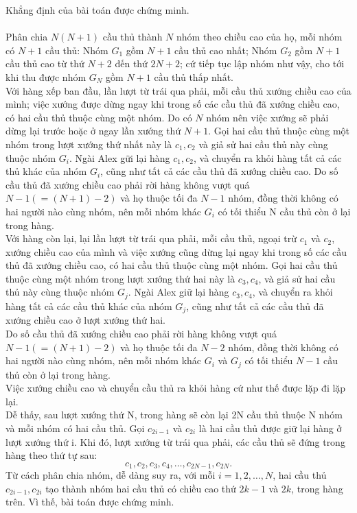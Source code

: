 \begin{bt}
{		Khẳng định của bài toán được chứng minh.\\
		\\ 
		Phân chia $N(N+1)$ cầu thủ thành $N$ nhóm theo chiều cao của họ, mỗi nhóm có $N+1$ cầu thủ: Nhóm $G_1$ gồm $N+1$ cầu thủ cao nhất; Nhóm $G_2$ gồm $N+1$ cầu thủ cao từ thứ $N+2$ đến thứ $2N+2$; cứ tiếp tục lập nhóm như vậy, cho tới khi thu được nhóm $G_N$ gồm $N+1$ cầu thủ thấp nhất.\\
		Với hàng xếp ban đầu, lần lượt từ trái qua phải, mỗi cầu thủ xướng chiều cao của mình; việc xướng được dừng ngay khi trong số các cầu thủ đã xướng chiều cao, có hai cầu thủ thuộc cùng một nhóm. Do có $N$ nhóm nên việc xướng sẽ phải dừng lại trước hoặc ở ngay lần xướng thứ $N+1$. Gọi hai cầu thủ thuộc cùng một nhóm trong lượt xướng thứ nhất này là $c_1,c_2$ và giả sử hai cầu thủ này cùng thuộc nhóm $G_i$. Ngài Alex gữi lại hàng $c_1, c_2$, và chuyển ra khỏi hàng tất cả các thủ khác của nhóm $G_i$, cũng như tất cả các cầu thủ đã xướng chiều cao. Do số cầu thủ đã xướng chiều cao phải rời hàng không vượt quá $N-1(=(N+1)-2)$ và họ thuộc tối đa $N-1$ nhóm, đồng thời không có hai người nào cùng nhóm, nên mỗi nhóm khác $G_i$ có tối thiểu N cầu thủ còn ở lại trong hàng.\\
		Với hàng còn lại, lại lần lượt từ trái qua phải, mỗi cầu thủ, ngoại trừ $c_1$ và $c_2$, xướng chiều cao của mình và việc xướng cũng dừng lại ngay khi trong số các cầu thủ đã xướng chiều cao, có hai cầu thủ thuộc cùng một nhóm. Gọi hai cầu thủ thuộc cùng một nhóm trong lượt xướng thứ hai này là $c_3, c_4$, và giả sử hai cầu thủ này cùng thuộc nhóm $G_j.$ Ngài Alex giữ lại hàng $c_3, c_4$, và chuyển ra khỏi hàng tất cả các cầu thủ khác của nhóm $G_j$, cũng như tất cả các cầu thủ đã xướng chiều cao ở lượt xướng thứ hai.\\
		Do số cầu thủ đã xướng chiều cao phải rời hàng không vượt quá $N-1(=(N+1)-2)$ và họ thuộc tối đa $N-2$ nhóm, đồng thời không có hai người nào cùng nhóm, nên mỗi nhóm khác $G_i$ và $G_j$ có tối thiểu $N-1$ cầu thủ còn ở lại trong hàng.\\
		Việc xướng chiều cao và chuyển cầu thủ ra khỏi hàng cứ như thế được lặp đi lặp lại.\\
		Dễ thấy, sau lượt xướng thứ N, trong hàng sẽ còn lại 2N cầu thủ thuộc N nhóm và mỗi nhóm có hai cầu thủ. Gọi $c_{2i-1}$ và $c_{2i}$ là hai cầu thủ được giữ lại hàng ở lượt xướng thứ i. Khi đó, lượt xướng từ trái qua phải, các cầu thủ sẽ đứng trong hàng theo thứ tự sau:
		$$c_1,c_2,c_3,c_4,\ldots,c_{2N-1},c_{2N}.$$
		Từ cách phân chia nhóm, dễ dàng suy ra, với mỗi $i=1,2,\ldots,N$, hai cầu thủ $c_{2i-1}, c_{2i}$ tạo thành nhóm hai cầu thủ có chiều cao thứ $2k-1$ và $2k$, trong hàng trên. Vì thế, bài toán được chứng minh.\\
}
\end{bt}
